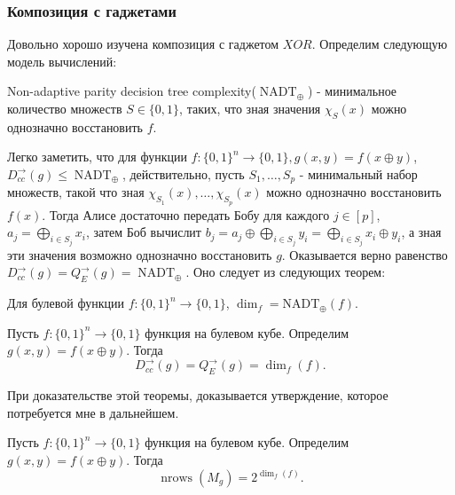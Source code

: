\documentclass{article}
\begin{document}
\subsubsection{Композиция с гаджетами} 
Довольно хорошо изучена композиция с гаджетом $XOR$. Определим следующую модель вычислений:
\begin{definition} Non-adaptive parity decision tree complexity($\operatorname{NADT}_{\oplus}$) -  минимальное количество множеств $S \in \{0, 1\}$, таких, что зная значения $\chi_{S}(x)$ можно однозначно восстановить $f$.
\end{definition}
Легко заметить, что для функции $f: \{0, 1\}^n \to \{0, 1\}, g(x, y) = f(x \oplus y)$, $D_{cc}^{\to}(g) \leq \operatorname{NADT}_{\oplus}$, действительно, пусть $S_1, \ldots, S_p$ - минимальный набор множеств, такой что зная $\chi_{S_1}(x), \ldots, \chi_{S_p}(x)$ можно однозначно восстановить $f(x)$. Тогда Алисе достаточно передать Бобу для каждого $j \in [p]$, $a_j = \bigoplus_{i \in S_j}x_i$, затем Боб вычислит $b_j  = a_j \oplus \bigoplus_{i \in S_j}y_i = \bigoplus_{i \in S_j}x_i \oplus y_i$, а зная эти значения возможно однозначно восстановить $g$. Оказывается верно равенство $D_{cc}^{\to}(g) = Q_{E}^{\to}(g) = \operatorname{NADT}_{\oplus}$. Оно следует из следующих теорем:
\begin{theorem}
\label{th:sanyal}
Для булевой функции $f : \{0, 1\}^n \to \{0, 1\}$, $\dim_f = \operatorname{NADT_{\oplus}}(f)$.
\end{theorem}
\begin{theorem}
    \label{th:montanaro}
    Пусть $f:\{0, 1\}^n \to \{0, 1\}$ функция на булевом кубе. Определим $g(x, y) = f(x \oplus y)$. Тогда
    $$D_{cc}^{\to}(g) = Q_{E}^{\to}(g) = \dim_{f}(f).$$
\end{theorem}
При доказательстве этой теоремы, доказывается утверждение, которое потребуется мне в дальнейшем.
\begin{claim}
    \label{cl:montanaro}
    Пусть $f:\{0, 1\}^n \to \{0, 1\}$ функция на булевом кубе. Определим $g(x, y) = f(x \oplus y)$.  Тогда
    $$\operatorname{nrows}(M_g) = 2^{\dim_{f}(f)}.$$
\end{claim} 
\end{document}
